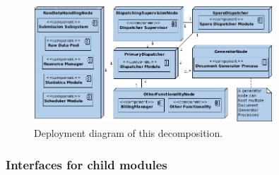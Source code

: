 \documentclass[a4paper,10pt]{article}
\begin{document}
\begin{figure}[!htp]
    \centering
    \includegraphics[width=0.8\textwidth]{depl_diag_1.png}
    \caption{Deployment diagram of this decomposition.}\label{fig:it1-depl_main}
\end{figure}

\subsubsection{Interfaces for child modules}
\end{document}
